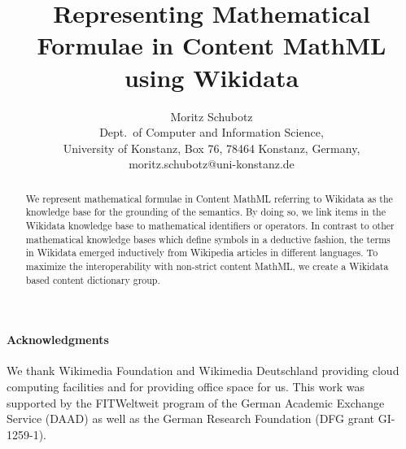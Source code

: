 \documentclass[a4paper]{article}
\title{Representing Mathematical Formulae in Content MathML using Wikidata}
\author{Moritz Schubotz \\
 Dept.~of Computer and Information Science,\\
 University of Konstanz, Box 76, 78464 Konstanz, Germany,\\
 moritz.schubotz@uni-konstanz.de
}
\begin{document}
\maketitle

\begin{abstract}
We represent mathematical formulae in Content MathML referring to Wikidata as the knowledge base for the grounding of the semantics.
By doing so, we link items in the Wikidata knowledge base to mathematical identifiers or operators.
In contrast to other mathematical knowledge bases which define symbols in a deductive fashion, the terms in Wikidata emerged inductively from Wikipedia articles in different languages.
To maximize the interoperability with non-strict content MathML, we create a Wikidata based content dictionary group.
\end{abstract}

\paragraph*{Acknowledgments} We thank Wikimedia Foundation and Wikimedia Deutschland providing cloud computing facilities and for providing office space for us.
This work was supported by the FITWeltweit program of the German Academic Exchange Service (DAAD) as well as the German Research Foundation (DFG grant GI-1259-1).
\end{document}
